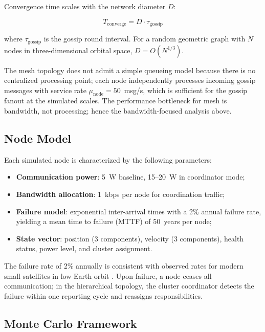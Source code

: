 \documentclass[journal]{IEEEtran}
\begin{document}
Convergence time scales with the network diameter $D$:

\begin{equation}
    T_{\text{converge}} = D \cdot \tau_{\text{gossip}}
    \label{eq:mesh_convergence}
\end{equation}

\noindent where $\tau_{\text{gossip}}$ is the gossip round interval. For a random geometric graph with $N$ nodes in three-dimensional orbital space, $D = O(N^{1/3})$.

The mesh topology does not admit a simple queueing model because there is no centralized processing point; each node independently processes incoming gossip messages with service rate $\mu_{\text{node}} = 50$~msg/s, which is sufficient for the gossip fanout at the simulated scales. The performance bottleneck for mesh is bandwidth, not processing; hence the bandwidth-focused analysis above.

\subsection{Node Model}

Each simulated node is characterized by the following parameters:

\begin{itemize}
    \item \textbf{Communication power}: 5~W baseline, 15--20~W in coordinator mode;
    \item \textbf{Bandwidth allocation}: 1~kbps per node for coordination traffic;
    \item \textbf{Failure model}: exponential inter-arrival times with a 2\% annual failure rate, yielding a mean time to failure (MTTF) of 50~years per node;
    \item \textbf{State vector}: position (3 components), velocity (3 components), health status, power level, and cluster assignment.
\end{itemize}

The failure rate of 2\% annually is consistent with observed rates for modern small satellites in low Earth orbit \cite{castet_smallsat_reliability}. Upon failure, a node ceases all communication; in the hierarchical topology, the cluster coordinator detects the failure within one reporting cycle and reassigns responsibilities.

\subsection{Monte Carlo Framework}
\end{document}
